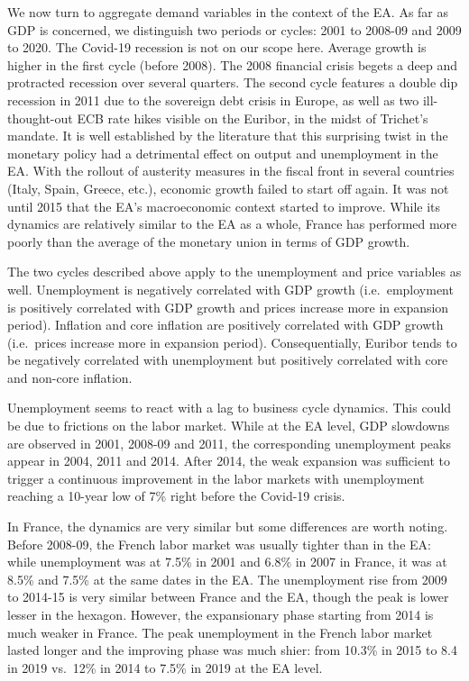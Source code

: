 \documentclass[
  11pt,
]{article}
\begin{document}
We now turn to aggregate demand variables in the context of the EA. As far as GDP is concerned, we distinguish two periods or cycles: 2001 to 2008-09 and 2009 to 2020. The Covid-19 recession is not on our scope here. Average growth is higher in the first cycle (before 2008). The 2008 financial crisis begets a deep and protracted recession over several quarters. The second cycle features a double dip recession in 2011 due to the sovereign debt crisis in Europe, as well as two ill-thought-out ECB rate hikes visible on the Euribor, in the midst of Trichet's mandate. It is well established by the literature that this surprising twist in the monetary policy had a detrimental effect on output and unemployment in the EA. With the rollout of austerity measures in the fiscal front in several countries (Italy, Spain, Greece, etc.), economic growth failed to start off again. It was not until 2015 that the EA's macroeconomic context started to improve. While its dynamics are relatively similar to the EA as a whole, France has performed more poorly than the average of the monetary union in terms of GDP growth.

The two cycles described above apply to the unemployment and price variables as well. Unemployment is negatively correlated with GDP growth (i.e.~employment is positively correlated with GDP growth and prices increase more in expansion period). Inflation and core inflation are positively correlated with GDP growth (i.e.~prices increase more in expansion period). Consequentially, Euribor tends to be negatively correlated with unemployment but positively correlated with core and non-core inflation.

Unemployment seems to react with a lag to business cycle dynamics. This could be due to frictions on the labor market. While at the EA level, GDP slowdowns are observed in 2001, 2008-09 and 2011, the corresponding unemployment peaks appear in 2004, 2011 and 2014. After 2014, the weak expansion was sufficient to trigger a continuous improvement in the labor markets with unemployment reaching a 10-year low of 7\% right before the Covid-19 crisis.

In France, the dynamics are very similar but some differences are worth noting. Before 2008-09, the French labor market was usually tighter than in the EA: while unemployment was at 7.5\% in 2001 and 6.8\% in 2007 in France, it was at 8.5\% and 7.5\% at the same dates in the EA. The unemployment rise from 2009 to 2014-15 is very similar between France and the EA, though the peak is lower lesser in the hexagon. However, the expansionary phase starting from 2014 is much weaker in France. The peak unemployment in the French labor market lasted longer and the improving phase was much shier: from 10.3\% in 2015 to 8.4 in 2019 vs.~12\% in 2014 to 7.5\% in 2019 at the EA level.
\end{document}

